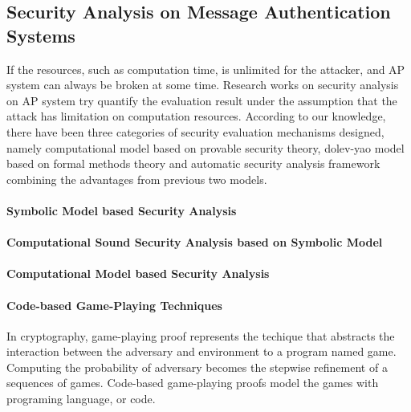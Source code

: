 \documentclass{article}
\begin{document}
\subsection{Security Analysis on Message Authentication Systems}
If the resources, such as computation time, is unlimited for the attacker, and AP system can always be broken at some time. Research works on security analysis on AP system try quantify the evaluation result under the assumption that the attack has limitation on computation resources. According to our knowledge, there have been three categories of security evaluation mechanisms designed, namely computational model based on provable security theory, dolev-yao model based on formal methods theory and automatic security analysis framework combining the advantages from previous two models.
\paragraph{Symbolic Model based Security Analysis}
\paragraph{Computational Sound Security Analysis based on Symbolic Model}
\paragraph{Computational Model based Security Analysis}

\paragraph{Code-based Game-Playing Techniques}
In cryptography, game-playing proof represents the techique that abstracts the interaction between the adversary and environment to a program named game. Computing the probability of adversary becomes the stepwise refinement of a sequences of games.
Code-based game-playing proofs model the games with programing language, or code.  

\
\end{document}
